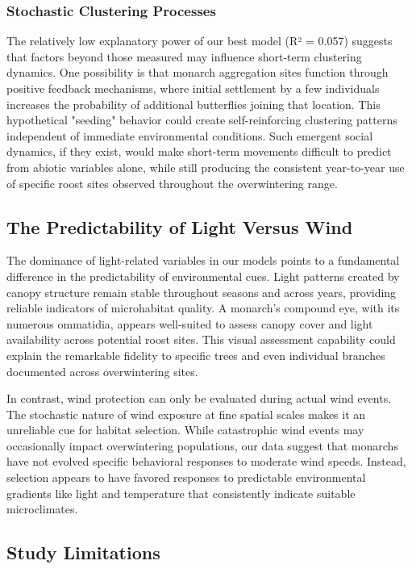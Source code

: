 \subsubsection{Stochastic Clustering Processes}

The relatively low explanatory power of our best model (R² = 0.057) suggests that factors beyond those measured may influence short-term clustering dynamics. One possibility is that monarch aggregation sites function through positive feedback mechanisms, where initial settlement by a few individuals increases the probability of additional butterflies joining that location. This hypothetical "seeding" behavior could create self-reinforcing clustering patterns independent of immediate environmental conditions. Such emergent social dynamics, if they exist, would make short-term movements difficult to predict from abiotic variables alone, while still producing the consistent year-to-year use of specific roost sites observed throughout the overwintering range.

\subsection{The Predictability of Light Versus Wind}

The dominance of light-related variables in our models points to a fundamental difference in the predictability of environmental cues. Light patterns created by canopy structure remain stable throughout seasons and across years, providing reliable indicators of microhabitat quality. A monarch's compound eye, with its numerous ommatidia, appears well-suited to assess canopy cover and light availability across potential roost sites. This visual assessment capability could explain the remarkable fidelity to specific trees and even individual branches documented across overwintering sites.

In contrast, wind protection can only be evaluated during actual wind events. The stochastic nature of wind exposure at fine spatial scales makes it an unreliable cue for habitat selection. While catastrophic wind events may occasionally impact overwintering populations, our data suggest that monarchs have not evolved specific behavioral responses to moderate wind speeds. Instead, selection appears to have favored responses to predictable environmental gradients like light and temperature that consistently indicate suitable microclimates.

\subsection{Study Limitations}

